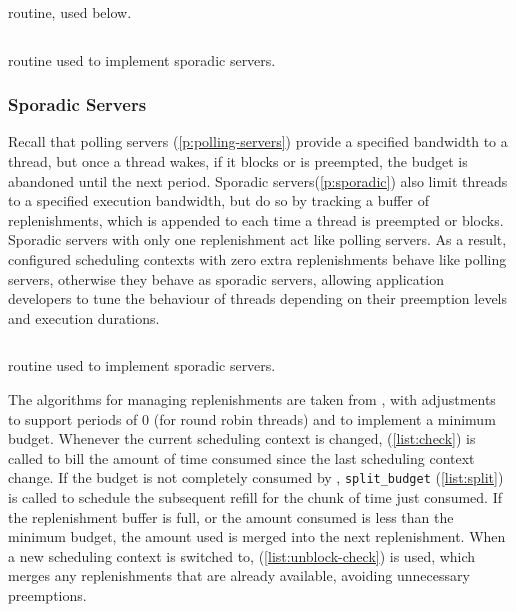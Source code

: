 \begin{listing}
\inputminted{c}{code/refill_used.c}
\caption[Schedule used routine.]{ routine, used below.}
\inputminted{c}{code/refill_check.c}
\caption[Check budget routine.]{ routine used to implement sporadic servers.}
\label{list:check}
\end{listing}

\subsubsection{Sporadic Servers}
\label{sec:impl-sporadic}

Recall that polling servers (\cref{p:polling-servers}) provide a specified bandwidth to a thread,
but once a thread wakes, if it blocks or is preempted, the budget is abandoned until the next
period. Sporadic servers(\cref{p:sporadic}) also limit threads to a specified execution bandwidth,
but do so by tracking a buffer of replenishments, which is appended to each time a thread is
preempted or blocks. Sporadic servers with only one replenishment act like polling servers.
As a result, configured scheduling contexts with zero extra replenishments behave like polling servers,
otherwise they behave as sporadic servers,  allowing application developers to
tune the behaviour of threads depending on their preemption levels and execution durations.

\begin{listing}
\inputminted{c}{code/split_check.c}
\caption[Split check routine.]{ routine used to implement sporadic servers.}
\label{list:split}
\end{listing}

The algorithms for managing replenishments are taken from \citet{Danish_LW_11}, with adjustments to
support periods of 0 (for round robin threads) and to implement a minimum budget.  Whenever the
current scheduling context is changed,  (\cref{list:check}) is called to bill the amount of time consumed since the last scheduling
context change. If the budget is not completely consumed by ,
\texttt{split\_budget} (\cref{list:split}) is called to schedule the
subsequent refill for the chunk of time just consumed.  If the replenishment buffer is full, or the
amount consumed is less than the minimum budget, the amount used is merged into the next
replenishment.  When a new scheduling context is switched to,  
(\cref{list:unblock-check}) is used, which merges any replenishments that are already available,
avoiding unnecessary preemptions.

